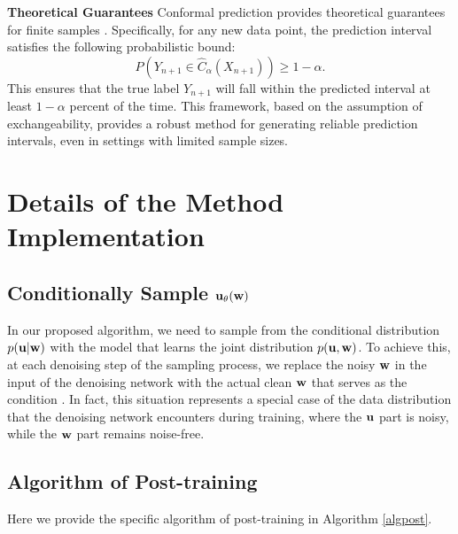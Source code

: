 \textbf{Theoretical Guarantees} Conformal prediction provides theoretical guarantees for finite samples \citep{vovk2005algorithmic, Lei2016DistributionFreePI}. Specifically, for any new data point, the prediction interval satisfies the following probabilistic bound:
   \[
   P(Y_{n+1} \in \hat{C}_\alpha(X_{n+1})) \geq 1 - \alpha.
   \]
This ensures that the true label $Y_{n+1}$ will fall within the predicted interval at least $1 - \alpha$ percent of the time. This framework, based on the assumption of exchangeability, provides a robust method for generating reliable prediction intervals, even in settings with limited sample sizes.

\section{Details of the Method Implementation}

\subsection{Conditionally Sample $\mathbf{u}_\theta(\mathbf{w})$}
In our proposed algorithm, we need to sample from the conditional distribution \( p(\mathbf{u}|\mathbf{w}) \) with the model that learns the joint distribution \( p(\mathbf{u}, \mathbf{w}) \). To achieve this, at each denoising step of the sampling process, we replace the noisy \(\mathbf{w}\) in the input of the denoising network with the actual clean \(\mathbf{w}\) that serves as the condition \citep{chung2023diffusion}. In fact, this situation represents a special case of the data distribution that the denoising network encounters during training, where the \(\mathbf{u}\) part is noisy, while the \(\mathbf{w}\) part remains noise-free.

\subsection{Algorithm of Post-training}
\label{app:algpost}
Here we provide the specific algorithm of post-training in Algorithm \ref{algpost}.

